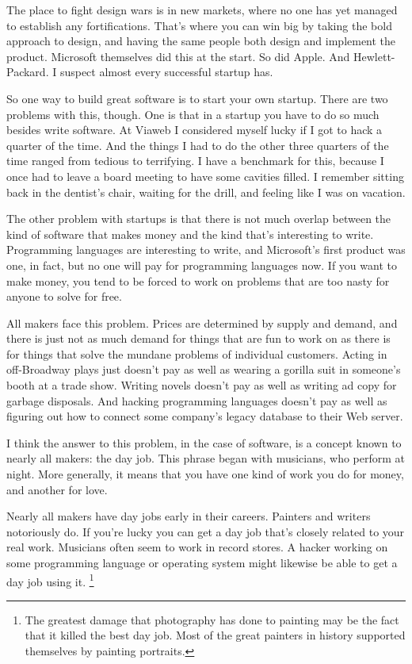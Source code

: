The place to fight design wars is in new markets, where no one has yet
managed to establish any fortifications. That's where you can win big by
taking the bold approach to design, and having the same people both
design and implement the product. Microsoft themselves did this at the
start. So did Apple. And Hewlett-Packard. I suspect almost every
successful startup has.

So one way to build great software is to start your own startup. There
are two problems with this, though. One is that in a startup you have to
do so much besides write software. At Viaweb I considered myself lucky
if I got to hack a quarter of the time. And the things I had to do the
other three quarters of the time ranged from tedious to terrifying. I
have a benchmark for this, because I once had to leave a board meeting
to have some cavities filled. I remember sitting back in the dentist's
chair, waiting for the drill, and feeling like I was on vacation.

The other problem with startups is that there is not much overlap
between the kind of software that makes money and the kind that's
interesting to write. Programming languages are interesting to write,
and Microsoft's first product was one, in fact, but no one will pay for
programming languages now. If you want to make money, you tend to be
forced to work on problems that are too nasty for anyone to solve for
free.

All makers face this problem. Prices are determined by supply and
demand, and there is just not as much demand for things that are fun to
work on as there is for things that solve the mundane problems of
individual customers. Acting in off-Broadway plays just doesn't pay as
well as wearing a gorilla suit in someone's booth at a trade show.
Writing novels doesn't pay as well as writing ad copy for garbage
disposals. And hacking programming languages doesn't pay as well as
figuring out how to connect some company's legacy database to their Web
server.

I think the answer to this problem, in the case of software, is a
concept known to nearly all makers: the day job. This phrase began with
musicians, who perform at night. More generally, it means that you have
one kind of work you do for money, and another for love.

Nearly all makers have day jobs early in their careers. Painters and
writers notoriously do. If you're lucky you can get a day job that's
closely related to your real work. Musicians often seem to work in
record stores. A hacker working on some programming language or
operating system might likewise be able to get a day job using it.
\footnote{The greatest damage that photography has done to painting may be
the fact that it killed the best day job. Most of the great painters in
history supported themselves by painting portraits.}

